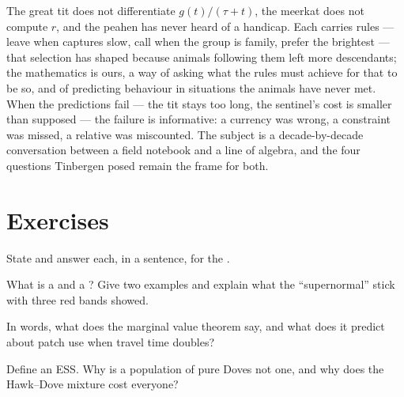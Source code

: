 \begin{remark}\label{rem:b3:behavioural-ecology:remark}
The great tit does not differentiate $g(t)/(\tau + t)$, the meerkat does
not compute $r$, and the peahen has never heard of a handicap. Each
carries rules --- leave when captures slow, call when the group is
family, prefer the brightest --- that selection has shaped because
animals following them left more descendants; the mathematics is ours,
a way of asking what the rules must achieve for that to be so, and of
predicting behaviour in situations the animals have never met. When
the predictions fail --- the tit stays too long, the sentinel's cost is
smaller than supposed --- the failure is informative: a currency was
wrong, a constraint was missed, a relative was miscounted. The subject
is a decade-by-decade conversation between a field notebook and a
line of algebra, and the four questions Tinbergen posed remain the
frame for both.
\end{remark}

\section{Exercises}

\begin{exercise}[$\star$]\label{exo:b3:behavioural-ecology:1}
State  and answer each, in a sentence, for
the .
\end{exercise}

\begin{exercise}[$\star$]\label{exo:b3:behavioural-ecology:2}
What is a  and a ? Give two examples
and explain what the ``supernormal'' stick with three red bands showed.
\end{exercise}

\begin{exercise}[$\star$]\label{exo:b3:behavioural-ecology:3}
In words, what does the marginal value theorem say, and what does it
predict about patch use when travel time doubles?
\end{exercise}

\begin{exercise}[$\star$]\label{exo:b3:behavioural-ecology:4}
Define an ESS. Why is a population of pure Doves not one, and why does
the Hawk--Dove mixture cost everyone?
\end{exercise}

